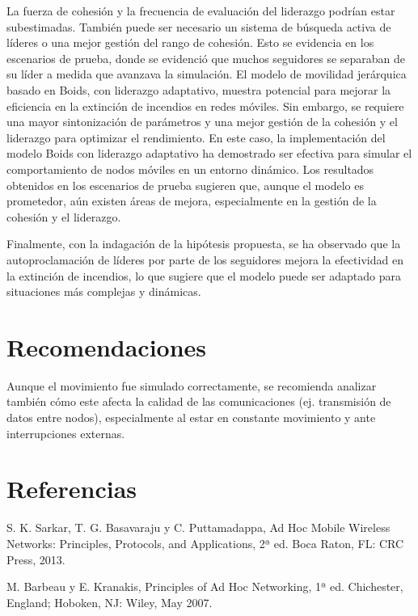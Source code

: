 \documentclass{article}
\begin{document}
La fuerza de cohesión y la frecuencia de evaluación del liderazgo podrían estar subestimadas. También puede ser necesario un sistema de búsqueda activa de líderes o una mejor gestión del rango de cohesión. Esto se evidencia en los escenarios de prueba, donde se evidenció que muchos seguidores se separaban de su líder a medida que avanzava la simulación.
El modelo de movilidad jerárquica basado en Boids, con liderazgo adaptativo, muestra potencial para mejorar la eficiencia en la extinción de incendios en redes móviles. Sin embargo, se requiere una mayor sintonización de parámetros y una mejor gestión de la cohesión y el liderazgo para optimizar el rendimiento.
En este caso, la implementación del modelo Boids con liderazgo adaptativo ha demostrado ser efectiva para simular el comportamiento de nodos móviles en un entorno dinámico. Los resultados obtenidos en los escenarios de prueba sugieren que, aunque el modelo es prometedor, aún existen áreas de mejora, especialmente en la gestión de la cohesión y el liderazgo.

Finalmente, con la indagación de la hipótesis propuesta, se ha observado que la autoproclamación de líderes por parte de los seguidores mejora la efectividad en la extinción de incendios, lo que sugiere que el modelo puede ser adaptado para situaciones más complejas y dinámicas.

\section{Recomendaciones}\label{secrecomen}

Aunque el movimiento fue simulado correctamente, se recomienda analizar también cómo este afecta la calidad de las comunicaciones (ej. transmisión de datos entre nodos), especialmente al estar en constante movimiento y ante interrupciones externas.

\section{Referencias}
\renewcommand{\refname}{}
\begin{thebibliography}{9}

 \label{ref:AdHoc} S. K. Sarkar, T. G. Basavaraju y C. Puttamadappa,
Ad Hoc Mobile Wireless Networks: Principles, Protocols, and Applications, 2ª ed.
Boca Raton, FL: CRC Press, 2013.

 \label{ref:PrinciplesAdHoc} M. Barbeau y E. Kranakis, Principles of Ad Hoc
Networking, 1ª ed. Chichester, England; Hoboken, NJ: Wiley, May 2007.

\end{thebibliography}
\end{document}
